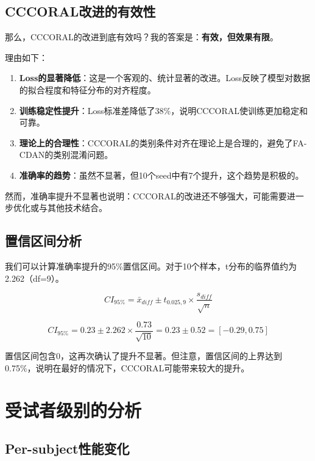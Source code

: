 \documentclass[12pt,a4paper]{ctexart}
\begin{document}
\subsection{CCCORAL改进的有效性}

那么，CCCORAL的改进到底有效吗？我的答案是：\textbf{有效，但效果有限}。

理由如下：

\begin{enumerate}
    \item \textbf{Loss的显著降低}：这是一个客观的、统计显著的改进。Loss反映了模型对数据的拟合程度和特征分布的对齐程度。
    
    \item \textbf{训练稳定性提升}：Loss标准差降低了38\%，说明CCCORAL使训练更加稳定和可靠。
    
    \item \textbf{理论上的合理性}：CCCORAL的类别条件对齐在理论上是合理的，避免了FA-CDAN的类别混淆问题。
    
    \item \textbf{准确率的趋势}：虽然不显著，但10个seed中有7个提升，这个趋势是积极的。
\end{enumerate}

然而，准确率提升不显著也说明：CCCORAL的改进还不够强大，可能需要进一步优化或与其他技术结合。

\subsection{置信区间分析}

我们可以计算准确率提升的95\%置信区间。对于10个样本，t分布的临界值约为2.262（df=9）。

\begin{equation}
CI_{95\%} = \bar{x}_{diff} \pm t_{0.025,9} \times \frac{s_{diff}}{\sqrt{n}}
\end{equation}

\begin{equation}
CI_{95\%} = 0.23 \pm 2.262 \times \frac{0.73}{\sqrt{10}} = 0.23 \pm 0.52 = [-0.29, 0.75]
\end{equation}

置信区间包含0，这再次确认了提升不显著。但注意，置信区间的上界达到0.75\%，说明在最好的情况下，CCCORAL可能带来较大的提升。

\section{受试者级别的分析}

\subsection{Per-subject性能变化}
\end{document}
